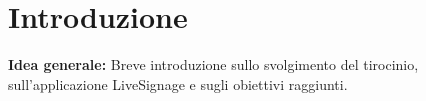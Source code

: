 \chapter{Introduzione}
\linespread{1.5}


\textbf{Idea generale:} Breve introduzione sullo svolgimento del tirocinio, sull'applicazione LiveSignage e sugli obiettivi raggiunti.
